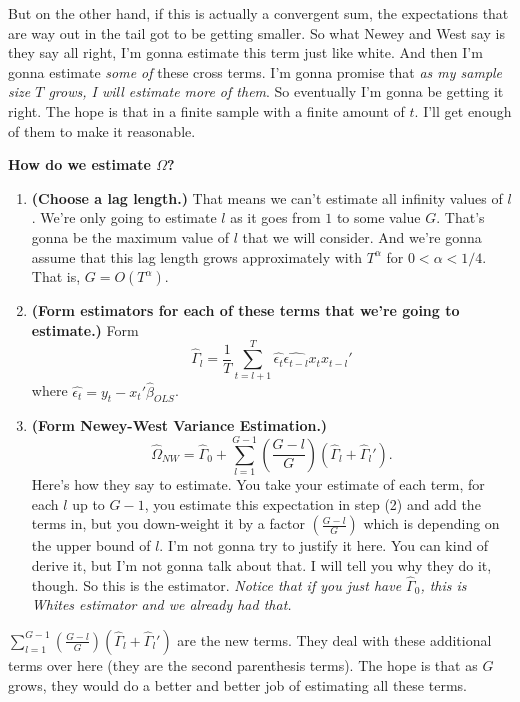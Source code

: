 \documentclass[11pt,a4paper]{amsart}
\theoremstyle{plain}
\theoremstyle{definition}
\begin{document}
    	 	  But on the other hand, if this is actually a convergent sum, the expectations that are way out in the tail got to be getting smaller. So what Newey and West say is they say all right, I'm gonna estimate this term just like white. And then I'm gonna estimate \emph{some of} these cross terms. I'm gonna promise that \emph{as my sample size $T$ grows, I will estimate more of them}. So eventually I'm gonna be getting it right. The hope is that in a finite sample with a finite amount of $t$. I'll get enough of them to make it reasonable.\par 
    	 	  \textbf{How do we estimate $\Omega$?}\par 
    	 	  \begin{enumerate}
    	 	  	\item \textbf{(Choose a lag length.)} That means we can't estimate all infinity values of $l$. We're only going to estimate $l$ as it goes from $1$ to some value $G$. That's gonna be the maximum value of $l$ that we will consider. And we're gonna assume that this lag length grows approximately with $T^{\alpha}$ for $0 < \alpha < 1/4$. That is, $G = O(T^{\alpha})$. 
    	 	  	\item \textbf{(Form estimators for each of these terms that we're going to estimate.)} Form 
    	 	  	\[	\hat{\Gamma}_{l} = \frac{1}{T}\sum_{t=l+1}^{T}\hat{\epsilon_{t}}\hat{\epsilon_{t-l}}x_{t}x_{t-l}'	\]
    	 	  	where $\hat{\epsilon_{t}} = y_{t} - x_{t}' \hat{\beta}_{OLS}$.
    	 	  	\item \textbf{(Form Newey-West Variance Estimation.)} 
    	 	  	\[	\hat{\Omega}_{NW} = \hat{\Gamma}_{0} + \sum_{ l = 1}^{G-1} (\frac{G-l}{G})(\hat{\Gamma}_{l} + \hat{\Gamma}_{l}').	\]
    	 	  	Here's how they say to estimate. You take your estimate of each term, for each $l$ up to $G-1$, you estimate this expectation in step (2) and add the terms in, but you down-weight it by a factor $(\frac{G-l}{G})$ which is depending on the upper bound of $l$. I'm not gonna try to justify it here. You can kind of derive it, but I'm not gonna talk about that. I will tell you why they do it, though. So this is the estimator. \emph{Notice that if you just have $\hat{\Gamma}_{0} $, this is Whites estimator and we already had that.} 
    	 	  \end{enumerate}\par 
     	  	$\sum_{ l = 1}^{G-1} (\frac{G-l}{G})(\hat{\Gamma}_{l} + \hat{\Gamma}_{l}')$ are the new terms. They deal with these additional terms over here (they are the second parenthesis terms). The hope is that as $G$ grows, they would do a better and better job of estimating all these terms.\par 
\end{document}
